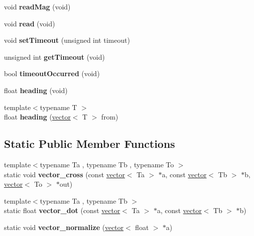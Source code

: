 \begin{DoxyCompactItemize}
void {\bfseries read\+Mag} (void)
\item 
\mbox{\label{class_l_s_m303_a9f40456878f534bba32490d19f3a64ce}} 
void {\bfseries read} (void)
\item 
\mbox{\label{class_l_s_m303_a707c5bfed3ff837aeeb2f990ad1151a9}} 
void {\bfseries set\+Timeout} (unsigned int timeout)
\item 
\mbox{\label{class_l_s_m303_a1aed58ffe20e8b323776df616eabd598}} 
unsigned int {\bfseries get\+Timeout} (void)
\item 
\mbox{\label{class_l_s_m303_a07602f1b10223a65173d7949b86c9eaf}} 
bool {\bfseries timeout\+Occurred} (void)
\item 
\mbox{\label{class_l_s_m303_ab81e2babe4d3011d642dc78ea71863de}} 
float {\bfseries heading} (void)
\item 
\mbox{\label{class_l_s_m303_a7d6df7654f9130e68723b55070fc5bbe}} 
{\footnotesize template$<$typename T $>$ }\\float {\bfseries heading} (\hyperlink{struct_l_s_m303_1_1vector}{vector}$<$ T $>$ from)
\end{DoxyCompactItemize}
\subsection*{Static Public Member Functions}
\begin{DoxyCompactItemize}
\item 
\mbox{\label{class_l_s_m303_ae590be5fbc5f3dc2b20349c462dd80bb}} 
{\footnotesize template$<$typename Ta , typename Tb , typename To $>$ }\\static void {\bfseries vector\+\_\+cross} (const \hyperlink{struct_l_s_m303_1_1vector}{vector}$<$ Ta $>$ $\ast$a, const \hyperlink{struct_l_s_m303_1_1vector}{vector}$<$ Tb $>$ $\ast$b, \hyperlink{struct_l_s_m303_1_1vector}{vector}$<$ To $>$ $\ast$out)
\item 
\mbox{\label{class_l_s_m303_a1fac94fcc4b58c085dee979544599037}} 
{\footnotesize template$<$typename Ta , typename Tb $>$ }\\static float {\bfseries vector\+\_\+dot} (const \hyperlink{struct_l_s_m303_1_1vector}{vector}$<$ Ta $>$ $\ast$a, const \hyperlink{struct_l_s_m303_1_1vector}{vector}$<$ Tb $>$ $\ast$b)
\item 
\mbox{\label{class_l_s_m303_ab0117d66614a77b1ef215c04fb47dcdc}} 
static void {\bfseries vector\+\_\+normalize} (\hyperlink{struct_l_s_m303_1_1vector}{vector}$<$ float $>$ $\ast$a)
\end{DoxyCompactItemize}
